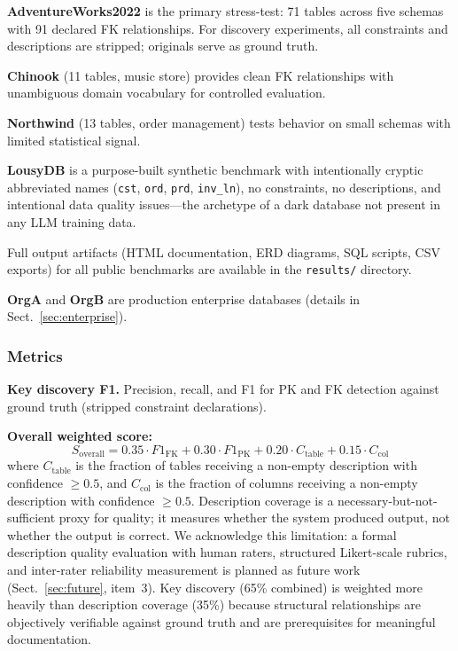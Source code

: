 \documentclass[twocolumn]{svjour3}
\begin{document}
\textbf{AdventureWorks2022} is the primary stress-test: 71 tables across five schemas with 91 declared FK relationships. For discovery experiments, all constraints and descriptions are stripped; originals serve as ground truth.

\textbf{Chinook} (11 tables, music store) provides clean FK relationships with unambiguous domain vocabulary for controlled evaluation.

\textbf{Northwind} (13 tables, order management) tests behavior on small schemas with limited statistical signal.

\textbf{LousyDB} is a purpose-built synthetic benchmark with intentionally cryptic abbreviated names (\texttt{cst}, \texttt{ord}, \texttt{prd}, \texttt{inv\_ln}), no constraints, no descriptions, and intentional data quality issues---the archetype of a dark database not present in any LLM training data.

Full output artifacts (HTML documentation, ERD diagrams, SQL scripts, CSV exports) for all public benchmarks are available in the \texttt{results/} directory.

\textbf{OrgA} and \textbf{OrgB} are production enterprise databases (details in Sect.~\ref{sec:enterprise}).

\subsubsection{Metrics}

\textbf{Key discovery F1.} Precision, recall, and F1 for PK and FK detection against ground truth (stripped constraint declarations).

\textbf{Overall weighted score:}
\begin{equation}
S_{\text{overall}} = 0.35 \cdot F1_{\text{FK}} + 0.30 \cdot F1_{\text{PK}} + 0.20 \cdot C_{\text{table}} + 0.15 \cdot C_{\text{col}}
\end{equation}
where $C_{\text{table}}$ is the fraction of tables receiving a non-empty description with confidence $\geq 0.5$, and $C_{\text{col}}$ is the fraction of columns receiving a non-empty description with confidence $\geq 0.5$. Description coverage is a necessary-but-not-sufficient proxy for quality; it measures whether the system produced output, not whether the output is correct. We acknowledge this limitation: a formal description quality evaluation with human raters, structured Likert-scale rubrics, and inter-rater reliability measurement is planned as future work (Sect.~\ref{sec:future}, item~3). Key discovery (65\% combined) is weighted more heavily than description coverage (35\%) because structural relationships are objectively verifiable against ground truth and are prerequisites for meaningful documentation.
\end{document}
